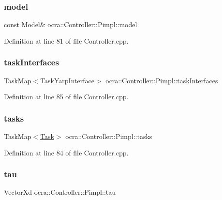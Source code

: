 \subsubsection{\texorpdfstring{model}{model}}
{\footnotesize\ttfamily const Model\& ocra\+::\+Controller\+::\+Pimpl\+::model}



Definition at line 81 of file Controller.\+cpp.

\hypertarget{structocra_1_1Controller_1_1Pimpl_a396836991948d8d90cf5852330d2c5c3}{}\label{structocra_1_1Controller_1_1Pimpl_a396836991948d8d90cf5852330d2c5c3} 
\subsubsection{\texorpdfstring{task\+Interfaces}{taskInterfaces}}
{\footnotesize\ttfamily Task\+Map$<$\hyperlink{classocra_1_1TaskYarpInterface}{Task\+Yarp\+Interface}$>$ ocra\+::\+Controller\+::\+Pimpl\+::task\+Interfaces}



Definition at line 85 of file Controller.\+cpp.

\hypertarget{structocra_1_1Controller_1_1Pimpl_a246fa1cc15ad20293ef78b04dc0dbe70}{}\label{structocra_1_1Controller_1_1Pimpl_a246fa1cc15ad20293ef78b04dc0dbe70} 
\subsubsection{\texorpdfstring{tasks}{tasks}}
{\footnotesize\ttfamily Task\+Map$<$\hyperlink{classocra_1_1Task}{Task}$>$ ocra\+::\+Controller\+::\+Pimpl\+::tasks}



Definition at line 84 of file Controller.\+cpp.

\hypertarget{structocra_1_1Controller_1_1Pimpl_a06e7fceb4a0a3c678a4e26fc12946e5c}{}\label{structocra_1_1Controller_1_1Pimpl_a06e7fceb4a0a3c678a4e26fc12946e5c} 
\subsubsection{\texorpdfstring{tau}{tau}}
{\footnotesize\ttfamily Vector\+Xd ocra\+::\+Controller\+::\+Pimpl\+::tau}



